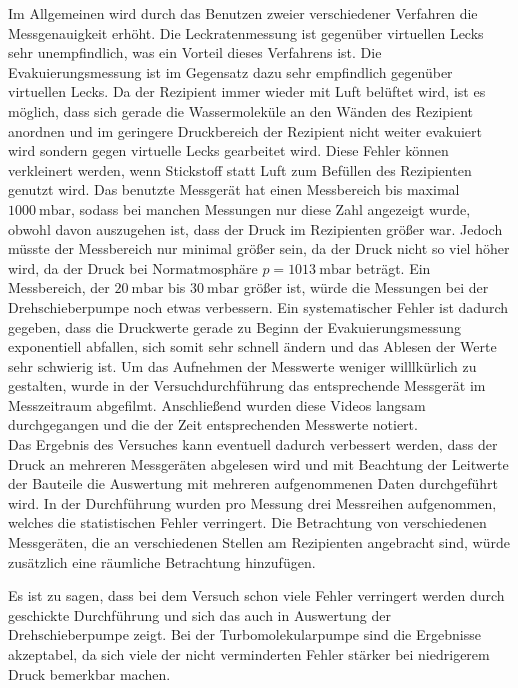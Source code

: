 \noindent Im Allgemeinen wird durch das Benutzen zweier verschiedener Verfahren die Messgenauigkeit erhöht. Die Leckratenmessung ist gegenüber virtuellen Lecks sehr unempfindlich, was 
ein Vorteil dieses Verfahrens ist. 
Die Evakuierungsmessung ist im Gegensatz dazu sehr empfindlich gegenüber virtuellen Lecks. Da der Rezipient immer wieder mit Luft belüftet wird, ist es möglich, dass sich gerade die Wassermoleküle 
an den Wänden des Rezipient anordnen und im geringere Druckbereich der Rezipient nicht weiter evakuiert wird sondern gegen virtuelle Lecks gearbeitet wird. 
Diese Fehler können verkleinert werden, wenn Stickstoff statt Luft zum Befüllen des Rezipienten genutzt wird. 
Das benutzte Messgerät hat einen Messbereich bis maximal $\SI{1000}{\milli\bar}$, sodass bei manchen Messungen nur diese Zahl angezeigt wurde, obwohl davon auszugehen ist, dass der Druck 
im Rezipienten größer war. Jedoch müsste der Messbereich nur minimal größer sein, da der Druck nicht so viel höher wird, da der Druck bei Normatmosphäre $p = \SI{1013}{\milli\bar}$ beträgt. 
Ein Messbereich, der $\SI{20}{\milli\bar}$ bis $\SI{30}{\milli\bar}$ größer ist, würde die Messungen bei der Drehschieberpumpe noch etwas verbessern. 
Ein systematischer Fehler ist dadurch gegeben, dass die Druckwerte gerade zu Beginn der Evakuierungsmessung exponentiell abfallen, sich somit sehr schnell ändern und das Ablesen der Werte 
sehr schwierig ist. Um das Aufnehmen der Messwerte weniger willlkürlich zu gestalten, wurde in der Versuchdurchführung das entsprechende Messgerät im Messzeitraum abgefilmt. Anschließend 
wurden diese Videos langsam durchgegangen und die der Zeit entsprechenden Messwerte notiert. \\
Das Ergebnis des Versuches kann eventuell dadurch verbessert werden, dass der Druck an mehreren Messgeräten abgelesen wird und mit Beachtung der Leitwerte der Bauteile die Auswertung mit 
mehreren aufgenommenen Daten durchgeführt wird. In der Durchführung wurden pro Messung drei Messreihen aufgenommen, welches die statistischen Fehler verringert. Die Betrachtung von 
verschiedenen Messgeräten, die an verschiedenen Stellen am Rezipienten angebracht sind, würde zusätzlich eine räumliche Betrachtung hinzufügen. 

\noindent Es ist zu sagen, dass bei dem Versuch schon viele Fehler verringert werden durch geschickte Durchführung und sich das auch in Auswertung der Drehschieberpumpe zeigt. Bei der 
Turbomolekularpumpe sind die Ergebnisse akzeptabel, da sich viele der nicht verminderten Fehler stärker bei niedrigerem Druck bemerkbar machen. 